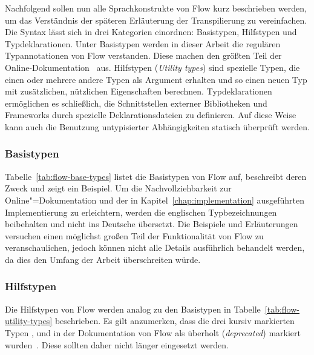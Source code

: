 Nachfolgend sollen nun alle Sprachkonstrukte von Flow kurz beschrieben werden, um das Verständnis der späteren Erläuterung der Transpilierung zu vereinfachen. Die Syntax lässt sich in drei Kategorien einordnen: Basistypen, Hilfstypen und Typdeklarationen.
Unter Basistypen werden in dieser Arbeit die regulären Typannotationen von Flow verstanden. Diese machen den größten Teil der Online-Dokumentation~\autocite{FLOW:TYPE_ANNOTATIONS} aus.
Hilfstypen (\textit{Utility types}) sind spezielle Typen, die einen oder mehrere andere Typen als Argument erhalten und so einen neuen Typ mit zusätzlichen, nützlichen Eigenschaften berechnen.
Typdeklarationen ermöglichen es schließlich, die Schnittstellen externer Bibliotheken und Frameworks durch spezielle Deklarationsdateien zu definieren. Auf diese Weise kann auch die Benutzung untypisierter Abhängigkeiten statisch überprüft werden.

\subsubsection{Basistypen}
\label{sec:flow:base-types}

Tabelle~\ref{tab:flow-base-types} listet die Basistypen von Flow auf, beschreibt deren Zweck und zeigt ein Beispiel. Um die Nachvollziehbarkeit zur Online"=Dokumentation und der in Kapitel~\ref{chap:implementation} ausgeführten Implementierung zu erleichtern, werden die englischen Typbezeichnungen beibehalten und nicht ins Deutsche übersetzt. Die Beispiele und Erläuterungen versuchen einen möglichst großen Teil der Funktionalität von Flow zu veranschaulichen, jedoch können nicht alle Details ausführlich behandelt werden, da dies den Umfang der Arbeit überschreiten würde.

\pagebreak


\subsubsection{Hilfstypen}
\label{sec:flow:utility-types}

Die Hilfstypen von Flow werden analog zu den Basistypen in Tabelle~\ref{tab:flow-utility-types} beschrieben. Es gilt anzumerken, dass die drei kursiv markierten Typen ,  und  in der Dokumentation von Flow als überholt (\textit{deprecated}) markiert wurden~\autocite{FLOW:UTILITY_TYPES}. Diese sollten daher nicht länger eingesetzt werden.

